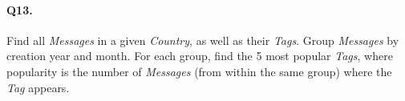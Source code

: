 \paragraph{Q13.}
Find all \emph{Messages} in a given \emph{Country}, as well as their
\emph{Tags}.
Group \emph{Messages} by creation year and month. For each group, find
the 5 most popular \emph{Tags}, where popularity is the number of
\emph{Messages} (from within the same group) where the \emph{Tag}
appears.
